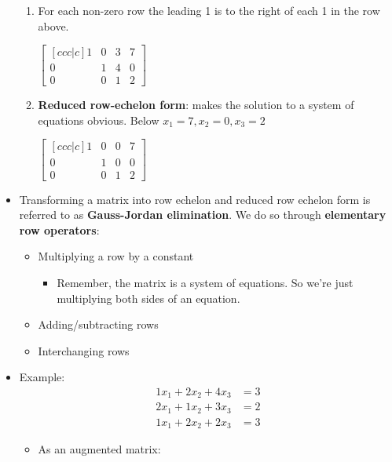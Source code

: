 \begin{itemize}
\begin{enumerate}
        \item For each non-zero row the leading 1 is to the right of each 1 in the row above.
            
        $\begin{bmatrix}[ccc|c]
            1 & 0 & 3 & 7 \\
            0 & 1 & 4 & 0 \\
            0 & 0 & 1 & 2 
        \end{bmatrix}$
            
        \item \textbf{Reduced row-echelon form}: makes the solution to a system of equations obvious. Below $x_1 = 7, x_2 = 0, x_3 = 2$
        
        $\begin{bmatrix}[ccc|c]
            1 & 0 & 0 & 7 \\
            0 & 1 & 0 & 0 \\
            0 & 0 & 1 & 2
        \end{bmatrix}$

    \end{enumerate}

    \item Transforming a matrix into row echelon and reduced row echelon form is referred to as \textbf{Gauss-Jordan elimination}. We do so through \textbf{elementary row operators}:
    
    \begin{itemize}
        \item Multiplying a row by a constant
        \begin{itemize}
            \item Remember, the matrix is a system of equations. So we're just multiplying both sides of an equation.
        \end{itemize}
        \item Adding/subtracting rows
        \item Interchanging rows
    \end{itemize}
    
    \item Example:
    \begin{align*}
        1x_1 + 2x_2 + 4x_3 & = 3 \\
        2x_1 + 1x_2 + 3x_3 & = 2 \\
        1x_1 + 2x_2 + 2x_3 & = 3
    \end{align*}

    \begin{itemize}
        \item As an augmented matrix:


\end{itemize}
\end{itemize}
